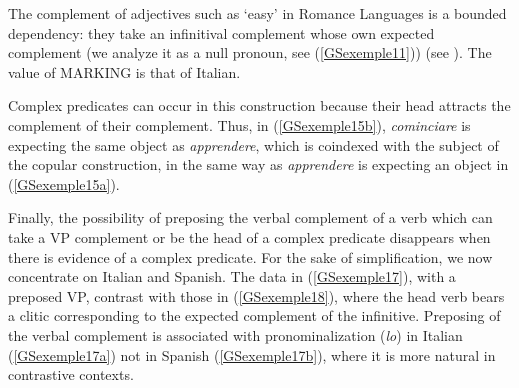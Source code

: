 \documentclass[output=paper]{langsci/langscibook}
\begin{document}
{\begin{exe}
\begin{xlist}
		\label{GSexemple15b}
		
		  \label{GSexemple15c} 	
	\end{xlist}
\end{exe}

The complement of adjectives such as `easy' in Romance Languages is a bounded dependency: they take an infinitival complement whose own expected complement (we analyze it as a null pronoun, see (\ref{GSexemple11})) (see \citealt{AGS1998, Monachesi98a}). The value of MARKING is that of Italian.

\begin{exe}
\end{exe}

Complex predicates can occur in this construction because their head attracts the complement of their complement. Thus, in (\ref{GSexemple15b}), \textit{cominciare} is expecting the same object as \textit{apprendere}, which is coindexed with the subject of the copular construction, in the same way as \textit{apprendere} is expecting an object in (\ref{GSexemple15a}). 

Finally, the possibility of preposing the verbal complement of a verb which can take a VP complement or be the head of a complex predicate disappears when there is evidence of a complex predicate. For the sake of simplification, we now concentrate on Italian and Spanish. The data in (\ref{GSexemple17}), with a preposed VP, contrast with those in (\ref{GSexemple18}), where the head verb bears a clitic corresponding to the expected complement of the infinitive. Preposing of the verbal complement is associated with pronominalization (\textit{lo}) in Italian (\ref{GSexemple17a}) not in Spanish (\ref{GSexemple17b}), where it is more natural in contrastive contexts.

}
\end{document}

